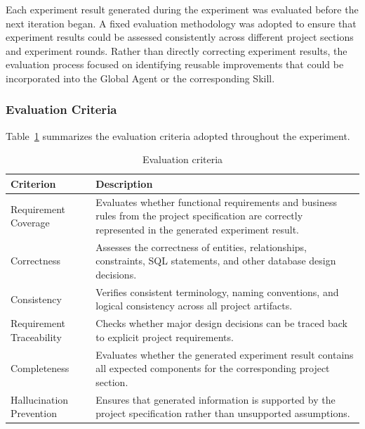Each experiment result generated during the experiment was evaluated before the next iteration began. A fixed evaluation methodology was adopted to ensure that experiment results could be assessed consistently across different project sections and experiment rounds. Rather than directly correcting experiment results, the evaluation process focused on identifying reusable improvements that could be incorporated into the Global Agent or the corresponding Skill.

\subsubsection{Evaluation Criteria}

Table~\ref{tab:criteria} summarizes the evaluation criteria adopted throughout the experiment.

\begin{table}[H]
\centering
\renewcommand{\arraystretch}{1.35}
\caption{Evaluation criteria}
\label{tab:criteria}

\begin{tabularx}{\linewidth}{>{\raggedright\arraybackslash}p{4cm}X}

\toprule

\textbf{Criterion}
&
\textbf{Description}

\\

\midrule

Requirement Coverage
&
Evaluates whether functional requirements and business rules from the project specification are correctly represented in the generated experiment result.
\\

Correctness
&
Assesses the correctness of entities, relationships, constraints, SQL statements, and other database design decisions.
\\

Consistency
&
Verifies consistent terminology, naming conventions, and logical consistency across all project artifacts.
\\

Requirement Traceability
&
Checks whether major design decisions can be traced back to explicit project requirements.
\\

Completeness
&
Evaluates whether the generated experiment result contains all expected components for the corresponding project section.
\\

Hallucination Prevention
&
Ensures that generated information is supported by the project specification rather than unsupported assumptions.
\\

\bottomrule

\end{tabularx}

\end{table}

